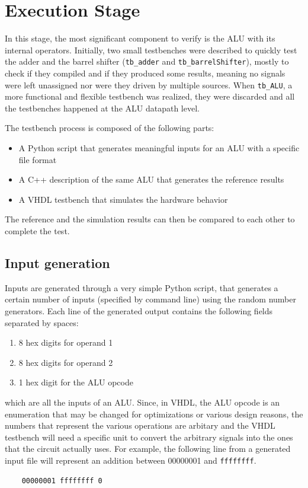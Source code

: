 \section{Execution Stage}
In this stage, the most significant component to verify is the ALU with its internal operators. Initially,
two small testbenches were described to quickly test the adder and the barrel shifter (\texttt{tb\_adder} and
\texttt{tb\_barrelShifter}), mostly to check if they compiled and if they produced some results, meaning no signals
were left unassigned nor were they driven by multiple sources. When \texttt{tb\_ALU}, a more functional and flexible
testbench was realized, they were discarded and all the testbenches happened at the ALU datapath level.

The testbench process is composed of the following parts:
\begin{itemize}
    \item A Python script that generates meaningful inputs for an ALU with a specific file format
    \item A C++ description of the same ALU that generates the reference results
    \item A VHDL testbench that simulates the hardware behavior
\end{itemize}
The reference and the simulation results can then be compared to each other to complete the test.

\subsection{Input generation}
\label{sec:tb-input-gen}
Inputs are generated through a very simple Python script, that generates a certain number of inputs (specified by
command line) using the random number generators. Each line of the
generated output contains the following fields separated by spaces:
\begin{enumerate}
    \item 8 hex digits for operand 1
    \item 8 hex digits for operand 2
    \item 1 hex digit for the ALU opcode
\end{enumerate}
which are all the inputs of an ALU. Since, in VHDL, the ALU opcode is an enumeration that may be changed for
optimizations or various design reasons, the numbers that represent the various operations are arbitary and the
VHDL testbench will need a specific unit to convert the arbitrary signals into the ones that the circuit actually uses.
For example, the following line from a generated input file will represent an addition between 00000001 and
\texttt{ffffffff}.
\begin{lstlisting}
    00000001 ffffffff 0
\end{lstlisting}

